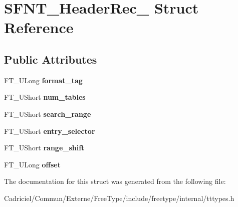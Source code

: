 \hypertarget{struct_s_f_n_t___header_rec__}{}\section{S\+F\+N\+T\+\_\+\+Header\+Rec\+\_\+ Struct Reference}
\label{struct_s_f_n_t___header_rec__}
\subsection*{Public Attributes}
\begin{DoxyCompactItemize}
\item 
F\+T\+\_\+\+U\+Long {\bfseries format\+\_\+tag}\hypertarget{struct_s_f_n_t___header_rec___ad59d649b189ab19fae02341e95e02448}{}\label{struct_s_f_n_t___header_rec___ad59d649b189ab19fae02341e95e02448}

\item 
F\+T\+\_\+\+U\+Short {\bfseries num\+\_\+tables}\hypertarget{struct_s_f_n_t___header_rec___a46d8d8bf8f2d8b6536eb5fa5704852e2}{}\label{struct_s_f_n_t___header_rec___a46d8d8bf8f2d8b6536eb5fa5704852e2}

\item 
F\+T\+\_\+\+U\+Short {\bfseries search\+\_\+range}\hypertarget{struct_s_f_n_t___header_rec___a39ca0e21eaec6be602547bb2ed898d5d}{}\label{struct_s_f_n_t___header_rec___a39ca0e21eaec6be602547bb2ed898d5d}

\item 
F\+T\+\_\+\+U\+Short {\bfseries entry\+\_\+selector}\hypertarget{struct_s_f_n_t___header_rec___ada628a85486eb034abd56b872ecdcd78}{}\label{struct_s_f_n_t___header_rec___ada628a85486eb034abd56b872ecdcd78}

\item 
F\+T\+\_\+\+U\+Short {\bfseries range\+\_\+shift}\hypertarget{struct_s_f_n_t___header_rec___aa2a39db194a8a9a0cc8504143ac4f5c1}{}\label{struct_s_f_n_t___header_rec___aa2a39db194a8a9a0cc8504143ac4f5c1}

\item 
F\+T\+\_\+\+U\+Long {\bfseries offset}\hypertarget{struct_s_f_n_t___header_rec___a04f99ce2ff335f8702a4edf7132a3e04}{}\label{struct_s_f_n_t___header_rec___a04f99ce2ff335f8702a4edf7132a3e04}

\end{DoxyCompactItemize}


The documentation for this struct was generated from the following file\+:\begin{DoxyCompactItemize}
\item 
Cadriciel/\+Commun/\+Externe/\+Free\+Type/include/freetype/internal/tttypes.\+h\end{DoxyCompactItemize}
